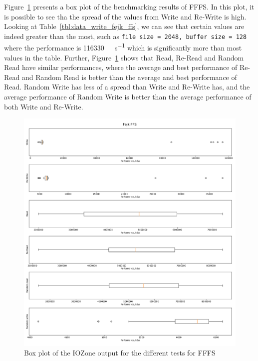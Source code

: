 Figure~\ref{fig:res_box_fffs} presents a box plot of the benchmarking results of FFFS. In this plot, it is possible to see tha the spread of the values from Write and Re-Write is high. Looking at Table~\ref{tbl:data_write_fejk_ffs}, we can see that certain values are indeed greater than the most, such as \texttt{file size = 2048, buffer size = 128} where the performance is \SI[per-mode = symbol]{116330}{\kilo\byte\per\second} which is significantly more than most values in the table. Further, Figure~\ref{fig:res_box_fffs} shows that Read, Re-Read and Random Read have similar performances, where the average and best performance of Re-Read and Random Read is better than the average and best performance of Read. Random Write has less of a spread than Write and Re-Write has, and the average performance of Random Write is better than the average performance of both Write and Re-Write.

\begin{figure}[!htb]
	\label{fig:res_box_fffs}
	\begin{center}
		\includegraphics[width=1.0\textwidth]{figures/benchmarking/fake-ffs/Fejk FFS-box.pdf}
	\end{center}
	\caption{Box plot of the IOZone output for the different tests for FFFS}
\end{figure}

